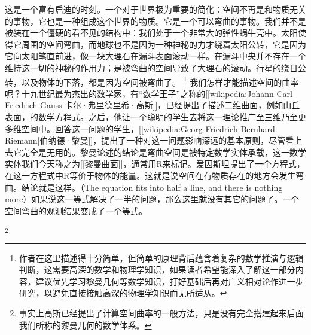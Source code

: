     这是一个富有启迪的时刻。一个对于世界极为重要的简化：空间不再是和物质无关的事物，它也是一种组成这个世界的物质。它是一个可以弯曲的事物。我们并不是被装在一个僵硬的看不见的结构中：我们处于一个非常大的弹性蜗牛壳中。太阳使得它周围的空间弯曲，而地球也不是因为一种神秘的力才绕着太阳公转，它是因为它向太阳笔直前进，像一块大理石在漏斗表面滚动一样。在漏斗中央并不存在一个维持这一切的神秘的作用力；是被弯曲的空间导致了大理石的滚动。行星的绕日公转，以及物体的下落，都是因为空间被弯曲了。
\footnote[3]
{
作者在这里描述得十分简单，但简单的原理背后蕴含着复杂的数学推演与逻辑判断，这需要高深的数学和物理学知识，如果读者希望能深入了解这一部分内容，建议优先学习黎曼几何等数学知识，打好基础后再对广义相对论作进一步研究，以避免直接接触高深的物理学知识而无所适从。
}
    我们怎样才能描述空间的曲率呢？十九世纪最为杰出的数学家，有“数学王子”之称的[[wikipedia:Johann Carl Friedrich Gauss|卡尔·弗里德里希·高斯]]，已经提出了描述二维曲面，例如山丘表面，的数学方程式。之后，他让一个聪明的学生去将这一理论推广至三维乃至更多维空间中。回答这一问题的学生，[[wikipedia:Georg Friedrich Bernhard Riemann|伯纳德·黎曼]]，提出了一种对这一问题影响深远的基本原则，尽管看上去它完全是无用的。黎曼论述的结论是弯曲空间是被特定数学实体承载，这一数学实体我们今天称之为[[黎曼曲面]]，通常用R来标记。爱因斯坦提出了一个方程式，在这一方程式中R等价于物体的能量。这就是说空间在有物质存在的地方会发生弯曲。结论就是这样。（The equation fits into half a line, and there is nothing more）如果说这一等式解决了一半的问题，那么这里就没有其它的问题了。一个空间弯曲的观测结果变成了一个等式。

\footnote[4]
{
事实上高斯已经提出了计算空间曲率的一般方法，只是没有完全搭建起来后面我们所称的黎曼几何的数学体系。
}

